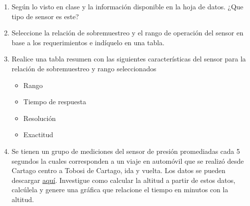 \documentclass[12pt]{article}
\begin{document}
\begin{enumerate}
    \item Según lo visto en clase y la información disponible en la hoja de datos. ¿Que tipo de sensor es este?
    \item Seleccione la relación de sobremuestreo y el rango de operación del sensor en base a los requerimientos e indíquelo en una tabla.
    \item Realice una tabla resumen con las siguientes características del sensor para la relación de sobremuestreo y rango seleccionados
    \begin{itemize}
        \item Rango
        \item Tiempo de respuesta
        \item Resolución
        \item Exactitud
    \end{itemize}
    \item Se tienen un grupo de mediciones del sensor de presión promediadas cada 5 segundos la cuales corresponden a un viaje en automóvil que se realizó desde Cartago centro a Tobosi de Cartago, ida y vuelta. Los datos se pueden descargar \href{https://estudianteccr-my.sharepoint.com/:u:/g/personal/prof_juan_rojas_estudiantec_cr/ES5u-pJPlFNBnMxKUXgPvi0B6mYtfNTDfYd4Du76JagNqA?e=5g6mPB}{aquí}. Investigue como calcular la altitud a partir de estos datos, calcúlela y genere una gráfica que relacione el tiempo en minutos con la altitud. 
\end{enumerate}
\end{document}
